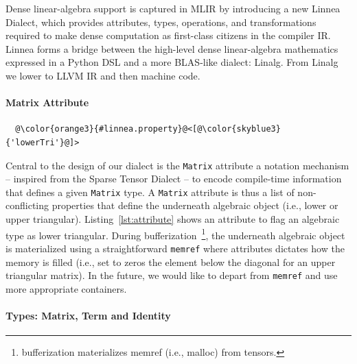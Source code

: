 \documentclass[conference]{IEEEtran}
\begin{document}
Dense linear-algebra support is captured in MLIR by introducing a new Linnea
Dialect, which provides attributes, types, operations, and transformations
required to make dense computation as first-class citizens in the compiler IR.
Linnea forms a bridge between the high-level dense linear-algebra mathematics
expressed in a Python DSL and a more BLAS-like dialect: Linalg. From Linalg we lower
to LLVM IR and then machine code.

\paragraph{Matrix Attribute}

\begin{listing}[]
\begin{center}
\begin{minipage}[]{0.5\textwidth}
\begin{verbatim}
  @\color{orange3}{#linnea.property}@<[@\color{skyblue3}{'lowerTri'}@]>
\end{verbatim}
\end{minipage}
\caption{Linnea attributes attach properties to the underneath algebraic object.}
\label{lst:attribute}
\end{center}
\end{listing}

Central to the design of our dialect is the \texttt{Matrix} attribute a
notation mechanism -- inspired from the Sparse Tensor Dialect -- to encode
compile-time information that defines a given \texttt{Matrix} type. A
\texttt{Matrix} attribute is thus a list of non-conflicting properties that
define the underneath algebraic object (i.e., lower or upper triangular).
Listing~\ref{lst:attribute} shows an attribute to flag an algebraic type as
lower triangular. During bufferization~\footnote{bufferization materializes
memref (i.e., malloc) from tensors.}, the underneath algebraic object is
materialized using a straightforward \texttt{memref} where attributes dictates
how the memory is filled (i.e., set to zeros the element below the diagonal for
an upper triangular matrix). In the future, we would like to depart from
\texttt{memref} and use more appropriate containers.

\paragraph{Types: Matrix, Term and Identity}
\end{document}
